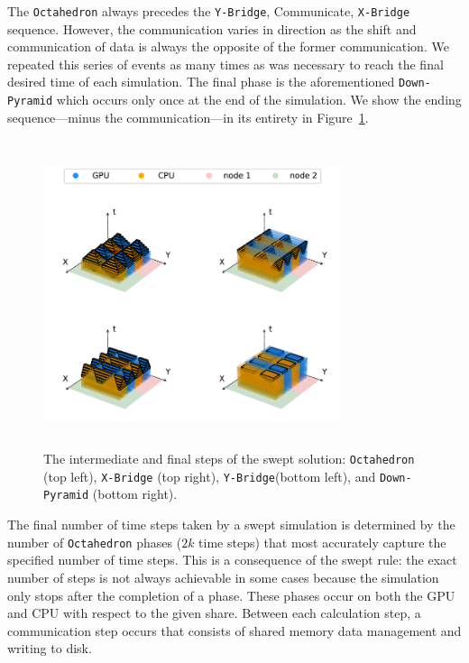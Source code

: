 \documentclass[preprints,article,accept,moreauthors,pdftex]{Definitions/mdpi}
\def\Down{\texttt{Down-Pyramid}}
\def\Oct{\texttt{Octahedron}}
\def\Xb{\texttt{X-Bridge}}
\def\Yb{\texttt{Y-Bridge}}
\begin{document}
The \Oct{} always precedes the \Yb{}, Communicate, \Xb{} sequence. However, the communication varies in direction as the shift and communication of data is always the opposite of the former communication. We repeated this series of events as many times as was necessary to reach the final desired time of each simulation. The final phase is the aforementioned \Down{} which occurs only once at the end of the simulation. We show the ending sequence---minus the communication---in its entirety in Figure~\ref{fig:MainTwo}. 


\begin{figure}[htbp]
    \centering
    \includegraphics[height=9cm,width=0.78\textwidth, trim={1cm 0.6cm 0.25cm 0cm},clip]{figs/SubsPlot2.pdf}
    \caption{The intermediate and final steps of the swept solution: \Oct{} (top left), \Xb{} (top right), \Yb (bottom left), and \Down{} (bottom right).}
    \label{fig:MainTwo}
\end{figure}

The final number of time steps taken by a swept simulation is determined by the number of \Oct{} phases ($2k$ time steps) that most accurately capture the specified number of time steps. This is a consequence of the swept rule: the exact number of steps is not always achievable in some cases because the simulation only stops after the completion of a phase. These phases occur on both the GPU and CPU with respect to the given share. Between each calculation step, a communication step occurs that consists of shared memory data management and writing to disk. 
\end{document}
